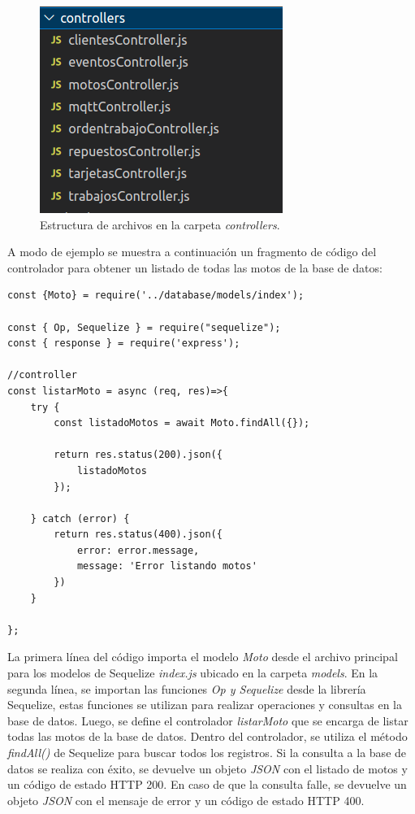 \begin{figure}[ht]
	\centering
	\includegraphics[scale=.50]{./Figures/api-controllers.png}
	\caption{Estructura de archivos en la carpeta \textit{controllers}.}
	\label{fig:apicontrollers}
	
\end{figure}

A modo de ejemplo se muestra a continuación un fragmento de código del controlador para obtener un listado de todas las motos de la base de datos:

\begin{lstlisting}[label=cod:routesot,caption=Código de controlador para obtener listado de motos.]
const {Moto} = require('../database/models/index');

const { Op, Sequelize } = require("sequelize");
const { response } = require('express');

//controller
const listarMoto = async (req, res)=>{
    try {
        const listadoMotos = await Moto.findAll({});
        
        return res.status(200).json({
            listadoMotos
        }); 

    } catch (error) {
        return res.status(400).json({
            error: error.message,
            message: 'Error listando motos'
        })
    }
    
};
\end{lstlisting}

La primera línea del código importa el modelo \textit{Moto} desde el archivo principal para los modelos de Sequelize \textit{index.js} ubicado en la carpeta \textit{models}. En la segunda línea, se importan las funciones \textit{Op y Sequelize} desde la librería Sequelize, estas funciones se utilizan para realizar operaciones y consultas en la base de datos. Luego, se define el controlador \textit{listarMoto} que se encarga de listar todas las motos de la base de datos. Dentro del controlador, se utiliza el método \textit{findAll()} de Sequelize para buscar todos los registros. Si la consulta a la base de datos se realiza con éxito, se devuelve un objeto \textit{JSON} con el listado de motos y un código de estado HTTP 200. En caso de que la consulta falle, se devuelve un objeto \textit{JSON} con el mensaje de error y un código de estado HTTP 400.

